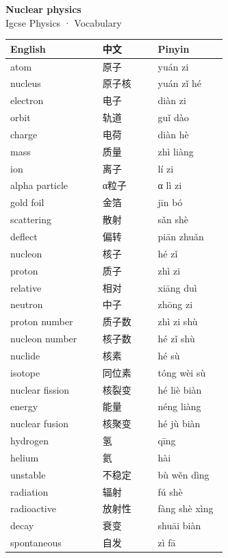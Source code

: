 \documentclass[11pt]{article}
\begin{document}
\begin{center}
  {\LARGE\bfseries Nuclear physics}\\[0.35em]
  {\large Igcse Physics · Vocabulary}
\end{center}
\vspace{0.6em}

\begin{longtable}{@{}p{0.40\linewidth}p{0.24\linewidth}p{0.30\linewidth}@{}}
\toprule
\textbf{English} & \textbf{中文} & \textbf{Pinyin} \\
\midrule
\endhead
\bottomrule
\endlastfoot
atom & 原子 & yuán zi \\
nucleus & 原子核 & yuán zǐ hé \\
electron & 电子 & diàn zi \\
orbit & 轨道 & guǐ dào \\
charge & 电荷 & diàn hè \\
mass & 质量 & zhì liàng \\
ion & 离子 & lí zi \\
alpha particle & α粒子 & α lì zi \\
gold foil & 金箔 & jīn bó \\
scattering & 散射 & sǎn shè \\
deflect & 偏转 & piān zhuǎn \\
nucleon & 核子 & hé zǐ \\
proton & 质子 & zhì zi \\
relative & 相对 & xiāng duì \\
neutron & 中子 & zhōng zi \\
proton number & 质子数 & zhì zi shù \\
nucleon number & 核子数 & hé zǐ shù \\
nuclide & 核素 & hé sù \\
isotope & 同位素 & tóng wèi sù \\
nuclear fission & 核裂变 & hé liè biàn \\
energy & 能量 & néng liàng \\
nuclear fusion & 核聚变 & hé jù biàn \\
hydrogen & 氢 & qīng \\
helium & 氦 & hài \\
unstable & 不稳定 & bù wěn dìng \\
radiation & 辐射 & fú shè \\
radioactive & 放射性 & fàng shè xìng \\
decay & 衰变 & shuāi biàn \\
spontaneous & 自发 & zì fā \\

\end{longtable}
\end{document}
